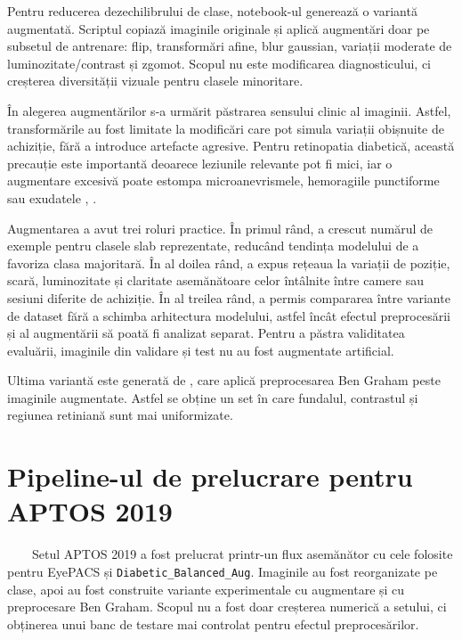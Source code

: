 \documentclass[12pt, a4paper, twoside, romanian]{teza-upb}
\begin{document}
Pentru reducerea dezechilibrului de clase, notebook-ul 
generează o variantă augmentată. Scriptul copiază imaginile originale și aplică augmentări
doar pe subsetul de antrenare: flip, transformări afine, blur gaussian, variații moderate
de luminozitate/contrast și zgomot. Scopul nu este modificarea diagnosticului, ci creșterea
diversității vizuale pentru clasele minoritare.
\bigskip

În alegerea augmentărilor s-a urmărit păstrarea sensului clinic al imaginii. Astfel, transformările
au fost limitate la modificări care pot simula variații obișnuite de achiziție, fără a introduce
artefacte agresive. Pentru retinopatia diabetică, această precauție este importantă deoarece
leziunile relevante pot fi mici, iar o augmentare excesivă poate estompa microanevrismele,
hemoragiile punctiforme sau exudatele \cite{1_niemeijer2005automatic}, \cite{2_sopharak2009automatic}.
\bigskip

Augmentarea a avut trei roluri practice. În primul rând, a crescut numărul de exemple pentru
clasele slab reprezentate, reducând tendința modelului de a favoriza clasa majoritară. În al
doilea rând, a expus rețeaua la variații de poziție, scară, luminozitate și claritate asemănătoare
celor întâlnite între camere sau sesiuni diferite de achiziție. În al treilea rând, a permis
compararea între variante de dataset fără a schimba arhitectura modelului, astfel încât efectul
preprocesării și al augmentării să poată fi analizat separat. Pentru a păstra validitatea
evaluării, imaginile din validare și test nu au fost augmentate artificial.
\bigskip

Ultima variantă este generată de , care aplică
preprocesarea Ben Graham peste imaginile augmentate. Astfel se obține un set în care
fundalul, contrastul și regiunea retiniană sunt mai uniformizate.

\section{Pipeline-ul de prelucrare pentru APTOS 2019}

\ \ \ \ Setul APTOS 2019 a fost prelucrat printr-un flux asemănător cu cele folosite pentru
EyePACS și \texttt{Diabetic\_Balanced\_Aug}. Imaginile au fost reorganizate pe clase, apoi au
fost construite variante experimentale cu augmentare și cu preprocesare Ben Graham. Scopul nu
a fost doar creșterea numerică a setului, ci obținerea unui banc de testare mai controlat pentru
efectul preprocesărilor.
\bigskip
\end{document}
